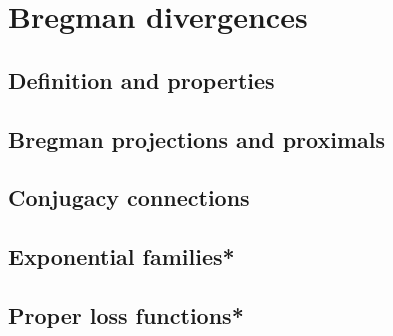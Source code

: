 \chapter{Bregman divergences}

\section{Definition and properties}


\section{Bregman projections and proximals}



\section{Conjugacy connections}


\section{Exponential families*}






\section{Proper loss functions*}



